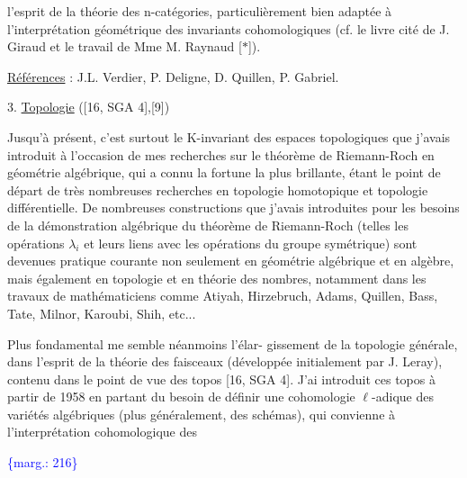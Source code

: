 \documentclass[11pt]{article}
\newcommand{\scanpage}[1]{\par\bigskip\noindent{\small\sffamily[scan #1]}\par}
\newcommand{\mspage}[1]{{\small\sffamily[p.\,#1]}}
\newcommand{\margin}[1]{\textcolor{blue}{\{\textsf{marg.:} #1\}}}
\newcommand{\uline}[1]{\underline{#1}}
\begin{document}
l'esprit de la théorie des n-catégories, particulièrement
bien adaptée à l'interprétation géométrique des invariants
cohomologiques (cf. le livre cité de J. Giraud et
le travail de Mme M. Raynaud [$*$]).

\uline{Références} : J.L. Verdier, P. Deligne, D. Quillen,
P. Gabriel.

3. \uline{Topologie} ([16, SGA 4],[9])

Jusqu'à présent, c'est surtout le K-invariant
des espaces topologiques que j'avais introduit à l'occasion
de mes recherches sur le théorème de Riemann-Roch en
géométrie algébrique, qui a connu la fortune la plus
brillante, étant le point de départ de très nombreuses
recherches en topologie homotopique et topologie
différentielle. De nombreuses constructions que j'avais
introduites pour les besoins de la démonstration algébrique
du théorème de Riemann-Roch (telles les opérations $\lambda_{i}$
et leurs liens avec les opérations du groupe symétrique)
sont devenues pratique courante non seulement en géométrie
algébrique et en algèbre, mais également en topologie
et en théorie des nombres, notamment dans les travaux
de mathématiciens comme Atiyah, Hirzebruch, Adams, Quillen,
Bass, Tate, Milnor, Karoubi, Shih, etc...

Plus fondamental me semble néanmoins l'élar-%
gissement de la topologie générale, dans l'esprit de
la théorie des faisceaux (développée initialement par
J. Leray), contenu dans le point de vue des topos
[16, SGA 4]. J'ai introduit ces topos à partir de 1958
en partant du besoin de définir une cohomologie $\ell$-adique
des variétés algébriques (plus généralement, des schémas),
qui convienne à l'interprétation cohomologique des

\margin{216}

\clearpage
\scanpage{119/217}
\mspage{. 4 .}
\end{document}
